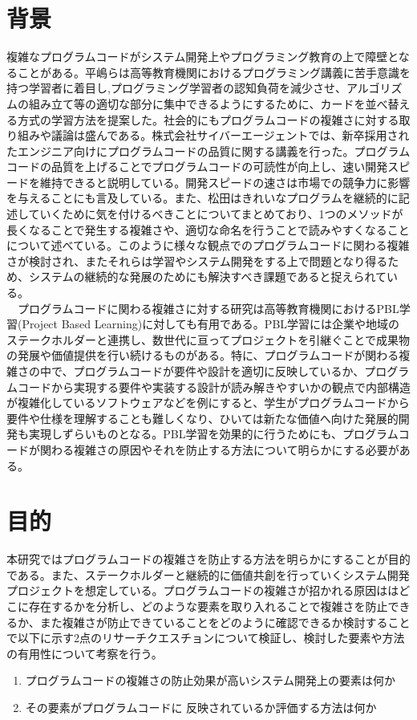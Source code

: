 \documentclass[12pt, a4paper]{jreport}
\begin{document}
    \section{背景}
    複雑なプログラムコードがシステム開発上やプログラミング教育の上で障壁となることがある。平嶋ら\cite{haikei}は高等教育機関におけるプログラミング講義に苦手意識を持つ学習者に着目し,プログラミング学習者の認知負荷を減少させ、アルゴリズムの組み立て等の適切な部分に集中できるようにするために、カードを並べ替える方式の学習方法を提案した。社会的にもプログラムコードの複雑さに対する取り組みや議論は盛んである。株式会社サイバーエージェント\cite{CyberZ}では、新卒採用されたエンジニア向けにプログラムコードの品質に関する講義を行った。プログラムコードの品質を上げることでプログラムコードの可読性が向上し、速い開発スピードを維持できると説明している。開発スピードの速さは市場での競争力に影響を与えることにも言及している。また、松田\cite{kireina}はきれいなプログラムを継続的に記述していくために気を付けるべきことについてまとめており、1つのメソッドが長くなることで発生する複雑さや、適切な命名を行うことで読みやすくなることについて述べている。このように様々な観点でのプログラムコードに関わる複雑さが検討され、またそれらは学習やシステム開発をする上で問題となり得るため、システムの継続的な発展のためにも解決すべき課題であると捉えられている。
    \\　プログラムコードに関わる複雑さに対する研究は高等教育機関におけるPBL学習(Project Based Learning)に対しても有用である。PBL学習には企業や地域のステークホルダーと連携し、数世代に亘ってプロジェクトを引継ぐことで成果物の発展や価値提供を行い続けるものがある。特に、プログラムコードが関わる複雑さの中で、プログラムコードが要件や設計を適切に反映しているか、プログラムコードから実現する要件や実装する設計が読み解きやすいかの観点で内部構造が複雑化しているソフトウェアなどを例にすると、学生がプログラムコードから要件や仕様を理解することも難しくなり、ひいては新たな価値へ向けた発展的開発も実現しずらいものとなる。PBL学習を効果的に行うためにも、プログラムコードが関わる複雑さの原因やそれを防止する方法について明らかにする必要がある。
\section{目的}
本研究ではプログラムコードの複雑さを防止する方法を明らかにすることが目的である。また、ステークホルダーと継続的に価値共創を行っていくシステム開発プロジェクトを想定している。プログラムコードの複雑さが招かれる原因ははどこに存在するかを分析し、どのような要素を取り入れることで複雑さを防止できるか、また複雑さが防止できていることをどのように確認できるか検討することで以下に示す2点のリサーチクエスチョンについて検証し、検討した要素や方法の有用性について考察を行う。
\begin{enumerate}
\item プログラムコードの複雑さの防止効果が高いシステム開発上の要素は何か
\item その要素がプログラムコードに
反映されているか評価する方法は何か
\end{enumerate}
\end{document}
